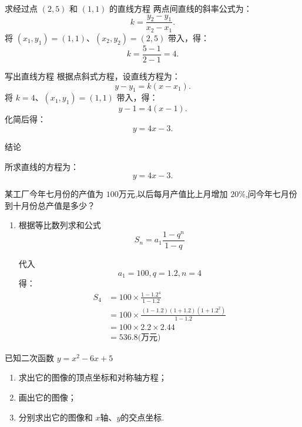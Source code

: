 \begin{questions}
\begin{solution}
\begin{cenum}
			\item{求经过点 $(2,5)$ 和 $(1,1)$ 的直线方程}
			两点间直线的斜率公式为：
			\[
				k = \frac{y_2 - y_1}{x_2 - x_1}.
			\]
			将 $(x_1, y_1) = (1,1)$、$(x_2, y_2) = (2,5)$ 带入，得：
			\[
				k = \frac{5 - 1}{2 - 1} = 4.
			\]

			\item{写出直线方程}
			根据点斜式方程，设直线方程为：
			\[
				y - y_1 = k(x - x_1).
			\]
			将 $k = 4$、$(x_1, y_1) = (1,1)$ 带入，得：
			\[
				y - 1 = 4(x - 1).
			\]
			化简后得：
			\[
				y = 4x - 3.
			\]

			\item{结论}

			所求直线的方程为：
			\[
				y = 4x - 3.
			\]
		\end{cenum}
	\end{solution}

	\question 某工厂今年七月份的产值为 \( 100 \)万元,以后每月产值比上月增加 \( 20\%
	\),问今年七月份到十月份总产值是多少？

	\begin{solution}
		\begin{enumerate}[label=\protect\circled{\arabic*}]
			\item[] 根据等比数列求和公式
			      \begin{equation*}
				      S_n = a_1\frac{1- q^n}{1-q}
			      \end{equation*}

			      代入
			      \begin{equation*}
				      a_1 = 100, q = 1.2, n = 4
			      \end{equation*}
			      得：
			      \begin{align*}
				      S_4 & = 100 \times \frac{1 - 1.2^4}{1 - 1.2}                     \\
				          & = 100 \times \frac{(1 - 1.2)(1 + 1.2)(1 + 1.2^2)}{1 - 1.2} \\
				          & = 100 \times 2.2 \times 2.44                               \\
				          & = 536.8 \text{(万元)}
			      \end{align*}
		\end{enumerate}
	\end{solution}

	\question 已知二次函数 \( y = x^2 - 6x + 5 \)
	\begin{enumerate}[label=(\arabic*)]
		\item 求出它的图像的顶点坐标和对称轴方程；
		\item 画出它的图像；
		\item 分别求出它的图像和 \( x \)轴、$ y $的交点坐标.
	\end{enumerate}


\end{questions}
